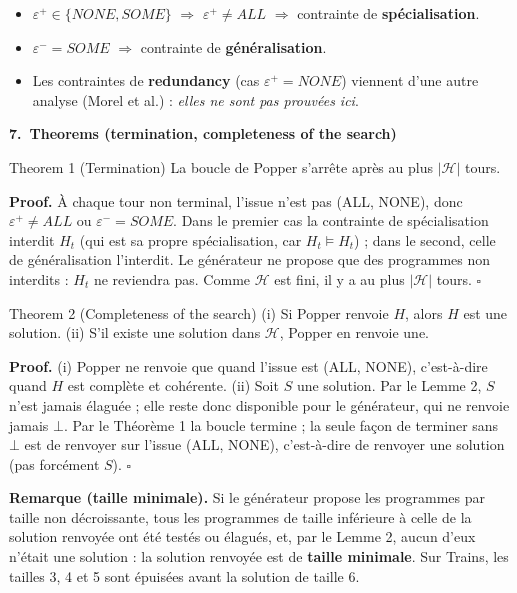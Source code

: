 \documentclass[10pt]{article}
\newcommand{\titrebox}[2]{\needspace{10\baselineskip}\vspace{8pt}
  \begin{tcolorbox}[colback=marine, colframe=marine, arc=0pt, boxrule=0pt,
    top=4pt, bottom=4pt, left=8pt]
  \color{white}\Large\bfseries #1.~#2
  \end{tcolorbox}\vspace{2pt}}
\newcommand{\st}[1]{\par\needspace{7\baselineskip}\vspace{5pt}{\normalsize\bfseries\textcolor{marine}{#1}}\par\vspace{2pt}}
\begin{document}
\st{Pourquoi la table des contraintes est cohérente avec ce lemme}
\begin{itemize}
  \item $\varepsilon^+\in\{\mathit{NONE},\mathit{SOME}\}$ $\Rightarrow$ $\varepsilon^+\neq\mathit{ALL}$ $\Rightarrow$ contrainte de \textbf{spécialisation}.
  \item $\varepsilon^-=\mathit{SOME}$ $\Rightarrow$ contrainte de \textbf{généralisation}.
  \item Les contraintes de \textbf{redundancy} (cas $\varepsilon^+=\mathit{NONE}$) viennent d'une autre analyse (Morel et al.) : \emph{elles ne sont pas prouvées ici}.
\end{itemize}

\titrebox{7}{Theorems (termination, completeness of the search)}
\begin{enonce}{Theorem 1 (Termination)}
La boucle de Popper s'arrête après au plus $|\mathcal{H}|$ tours.
\end{enonce}
\textbf{Proof.} À chaque tour non terminal, l'issue n'est pas (ALL, NONE), donc $\varepsilon^+\neq\mathit{ALL}$ ou $\varepsilon^-=\mathit{SOME}$. Dans le premier cas la contrainte de spécialisation interdit $H_t$ (qui est sa propre spécialisation, car $H_t\models H_t$) ; dans le second, celle de généralisation l'interdit. Le générateur ne propose que des programmes non interdits : $H_t$ ne reviendra pas. Comme $\mathcal{H}$ est fini, il y a au plus $|\mathcal{H}|$ tours. \hfill $\square$

\begin{enonce}{Theorem 2 (Completeness of the search)}
(i) Si Popper renvoie $H$, alors $H$ est une solution. (ii) S'il existe une solution dans $\mathcal{H}$, Popper en renvoie une.
\end{enonce}
\textbf{Proof.} (i) Popper ne renvoie que quand l'issue est (ALL, NONE), c'est-à-dire quand $H$ est complète et cohérente.
(ii) Soit $S$ une solution. Par le Lemme 2, $S$ n'est jamais élaguée ; elle reste donc disponible pour le générateur, qui ne renvoie jamais $\bot$. Par le Théorème 1 la boucle termine ; la seule façon de terminer sans $\bot$ est de renvoyer sur l'issue (ALL, NONE), c'est-à-dire de renvoyer une solution (pas forcément $S$). \hfill $\square$

\begin{moi}
\textbf{Remarque (taille minimale).} Si le générateur propose les programmes par taille non décroissante, tous les programmes de taille inférieure à celle de la solution renvoyée ont été testés ou élagués, et, par le Lemme 2, aucun d'eux n'était une solution : la solution renvoyée est de \textbf{taille minimale}. Sur Trains, les tailles 3, 4 et 5 sont épuisées avant la solution de taille 6.
\end{moi}
\end{document}
